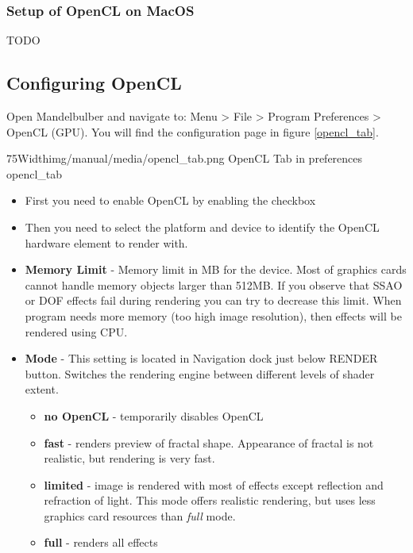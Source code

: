 \subsubsection{Setup of OpenCL on MacOS}\label{setup-opencl-macos}
TODO

\subsection{Configuring OpenCL}\label{configure-opencl}
Open Mandelbulber and navigate to: Menu > File > Program Preferences > OpenCL (GPU).
You will find the configuration page in figure \ref{opencl_tab}.

\simpleImageWithCaption75Width{img/manual/media/opencl_tab.png}
{OpenCL Tab in preferences}
{opencl_tab}

\begin{itemize}
	\item First you need to enable OpenCL by enabling the checkbox
	\item Then you need to select the platform and device to identify the OpenCL hardware 
		element to render with.
	\item \textbf{Memory Limit} - Memory limit in MB for the device. Most of graphics cards cannot handle memory objects larger than 512MB. If you observe that SSAO or DOF effects fail during rendering you can try to decrease this limit. When program needs more memory (too high image resolution), then effects will be rendered using CPU.
	\item \textbf{Mode} - This setting is located in Navigation dock just below RENDER button. Switches the rendering engine between different levels of shader extent.
	\begin{itemize}
		\item  \textbf{no OpenCL} - temporarily disables OpenCL 
		\item  \textbf{fast} - renders preview of fractal shape. Appearance of fractal is not realistic, but rendering is very fast.
		\item  \textbf{limited} - image is rendered with most of effects except reflection and refraction of light. This mode offers realistic rendering, but uses less graphics card resources than \emph{full} mode. 
		\item  \textbf{full} - renders all effects
	\end{itemize}	

	
\end{itemize}
